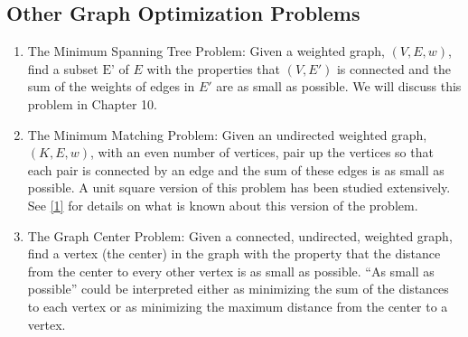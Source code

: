 \documentclass[10pt,]{book}
\theoremstyle{plain}
\theoremstyle{definition}
\theoremstyle{definition}
\theoremstyle{definition}
\theoremstyle{definition}
\theoremstyle{definition}
\numberwithin{equation}{section}
\begin{document}
\subsection[Other Graph Optimization Problems]{Other Graph Optimization Problems}\label{ss-other-optimization}
\leavevmode%
\begin{enumerate}[label=\arabic*]
\item\hypertarget{li-99}{}  The Minimum Spanning Tree Problem: Given a weighted graph, \((V, E, w)\), find a subset \(\text{E'}\) of \(E\) with
the properties that \((V, E')\) is connected and the sum of the weights of edges in \(E'\) are as small as possible. We will discuss this problem in Chapter 10.%
\item\hypertarget{li-100}{}  The Minimum Matching Problem: Given an undirected weighted graph, \((K, E, w)\), with an even number of vertices, pair up the vertices
so that each pair is connected by an edge and the sum of these edges is as small as possible. A unit square version of this problem has been studied extensively. See \hyperlink{biblio-sopowit-1983}{[1]} for details on what is known about this version of the problem. %
\item\hypertarget{li-101}{}  The Graph Center Problem: Given a connected, undirected, weighted graph, find a vertex (the center) in the graph with the property
that the distance from the center to every other vertex is as small as possible. ``As small as possible'' could be interpreted either as minimizing the sum of the distances to each vertex or as minimizing the maximum distance from the center to a vertex.
%
\end{enumerate}
%
\typeout{************************************************}
\typeout{************************************************}
\end{document}
